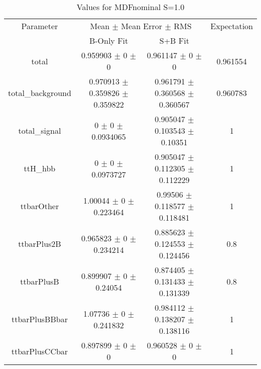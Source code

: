 \begin{table}
\centering
\caption{Values for MDFnominal S=1.0}
\begin{tabular}{cccc}
\toprule
Parameter & \multicolumn{2}{c}{Mean $\pm$ Mean Error $\pm$ RMS} & Expectation\\
 & B-Only Fit & S+B Fit & \\
\midrule
total & \num{0.959903} $\pm$ \num{0} $\pm$ \num{0} & \num{0.961147} $\pm$ \num{0} $\pm$ \num{0} & \num{0.961554}\\
total\_background & \num{0.970913} $\pm$ \num{0.359826} $\pm$ \num{0.359822} & \num{0.961791} $\pm$ \num{0.360568} $\pm$ \num{0.360567} & \num{0.960783}\\
total\_signal & \num{0} $\pm$ \num{0} $\pm$ \num{0.0934065} & \num{0.905047} $\pm$ \num{0.103543} $\pm$ \num{0.10351} & \num{1}\\
ttH\_hbb & \num{0} $\pm$ \num{0} $\pm$ \num{0.0973727} & \num{0.905047} $\pm$ \num{0.112305} $\pm$ \num{0.112229} & \num{1}\\
ttbarOther & \num{1.00044} $\pm$ \num{0} $\pm$ \num{0.223464} & \num{0.99506} $\pm$ \num{0.118577} $\pm$ \num{0.118481} & \num{1}\\
ttbarPlus2B & \num{0.965823} $\pm$ \num{0} $\pm$ \num{0.234214} & \num{0.885623} $\pm$ \num{0.124553} $\pm$ \num{0.124456} & \num{0.8}\\
ttbarPlusB & \num{0.899907} $\pm$ \num{0} $\pm$ \num{0.24054} & \num{0.874405} $\pm$ \num{0.131433} $\pm$ \num{0.131339} & \num{0.8}\\
ttbarPlusBBbar & \num{1.07736} $\pm$ \num{0} $\pm$ \num{0.241832} & \num{0.984112} $\pm$ \num{0.138207} $\pm$ \num{0.138116} & \num{1}\\
ttbarPlusCCbar & \num{0.897899} $\pm$ \num{0} $\pm$ \num{0} & \num{0.960528} $\pm$ \num{0} $\pm$ \num{0} & \num{1}\\
\bottomrule
\end{tabular}
\end{table}